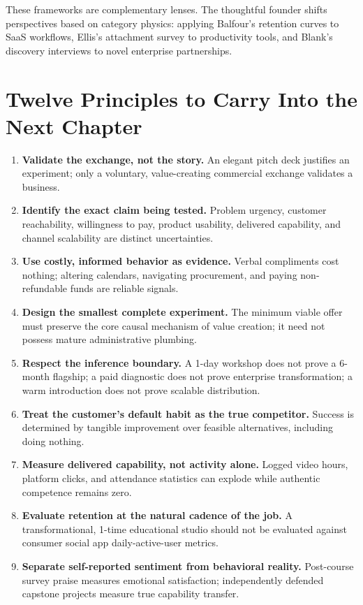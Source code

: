 These frameworks are complementary lenses. The thoughtful founder shifts perspectives based on category physics: applying Balfour's retention curves to SaaS workflows, Ellis's attachment survey to productivity tools, and Blank's discovery interviews to novel enterprise partnerships.

\section*{Twelve Principles to Carry Into the Next Chapter}

\begin{enumerate}
    \item \textbf{Validate the exchange, not the story.} An elegant pitch deck justifies an experiment; only a voluntary, value-creating commercial exchange validates a business.
    \item \textbf{Identify the exact claim being tested.} Problem urgency, customer reachability, willingness to pay, product usability, delivered capability, and channel scalability are distinct uncertainties.
    \item \textbf{Use costly, informed behavior as evidence.} Verbal compliments cost nothing; altering calendars, navigating procurement, and paying non-refundable funds are reliable signals.
    \item \textbf{Design the smallest complete experiment.} The minimum viable offer must preserve the core causal mechanism of value creation; it need not possess mature administrative plumbing.
    \item \textbf{Respect the inference boundary.} A 1-day workshop does not prove a 6-month flagship; a paid diagnostic does not prove enterprise transformation; a warm introduction does not prove scalable distribution.
    \item \textbf{Treat the customer's default habit as the true competitor.} Success is determined by tangible improvement over feasible alternatives, including doing nothing.
    \item \textbf{Measure delivered capability, not activity alone.} Logged video hours, platform clicks, and attendance statistics can explode while authentic competence remains zero.
    \item \textbf{Evaluate retention at the natural cadence of the job.} A transformational, 1-time educational studio should not be evaluated against consumer social app daily-active-user metrics.
    \item \textbf{Separate self-reported sentiment from behavioral reality.} Post-course survey praise measures emotional satisfaction; independently defended capstone projects measure true capability transfer.

\end{enumerate}
